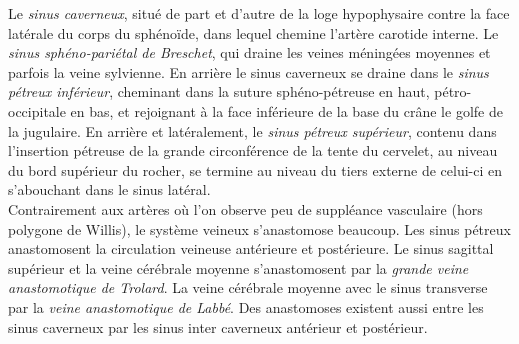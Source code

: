 Le {\em sinus caverneux}, situé de part et d’autre de la loge hypophysaire contre la face latérale du corps du sphénoïde, dans lequel chemine l’artère carotide interne. Le {\em sinus sphéno-pariétal de Breschet}, qui draine les veines méningées moyennes et parfois la veine sylvienne. En arrière le sinus caverneux se draine dans le {\em sinus pétreux inférieur}, cheminant dans la suture sphéno-pétreuse en haut, pétro-occipitale en bas, et rejoignant à la face inférieure de la base du crâne le golfe de la jugulaire. En arrière et latéralement, le {\em sinus pétreux supérieur}, contenu dans l’insertion pétreuse de la grande circonférence de la tente du cervelet, au niveau du bord supérieur du rocher, se termine au niveau du tiers externe de celui-ci en s’abouchant dans le sinus latéral.\\
Contrairement aux artères où l’on observe peu de suppléance vasculaire (hors polygone de Willis), le système veineux s’anastomose beaucoup. Les sinus pétreux anastomosent la circulation veineuse antérieure et postérieure. Le sinus sagittal supérieur et la veine cérébrale moyenne s’anastomosent par la {\em grande veine anastomotique de Trolard}. La veine cérébrale moyenne avec le sinus transverse par la {\em veine anastomotique de Labbé}. Des anastomoses existent aussi entre les sinus caverneux par les sinus inter caverneux antérieur et postérieur.\\
